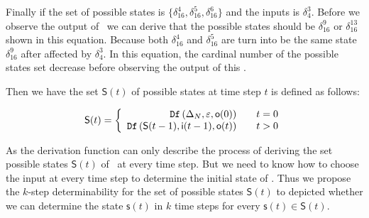 \begin{example}
 Finally if the set of possible states is $\{\delta_{16}^4,\delta_{16}^5,\delta_{16}^6\}$ and the inputs is $\delta_4^3$. Before we observe the output of \BCN\ we can derive that the possible states should be $\delta_{16}^9$ or $\delta_{16}^{13}$ shown in this equation. Because both $\delta_{16}^4$ and $\delta_{16}^5$ are turn into be the same state $\delta_{16}^9$ after affected by $\delta_4^3$.  In this equation, the cardinal number of the possible states set decrease before observing the output of this \BCN.%
 \label{exa:8}
 \end{example}   
 
 Then we have the set $\mathsf{S}(t)$ of possible states at time step $t$ is defined as follows:
 \begin{definition}[$\mathsf{S}(t)$]
	\[\mathsf{S}(t)=\left\{
\begin{array}{rcl}
{\tt Df}\left(\Delta_N,\varepsilon,\mathsf{o}(0)\right)      &      & {t=0}\\
{\tt Df}\left(\mathsf{S}(t-1),\mathsf{i}(t-1),\mathsf{o}(t)\right)       &      & {t>0}
\end{array} \right. \]
\end{definition}
 
 As the derivation function can only describe the process of deriving the set possible states $\mathsf{S}(t)$ of \BCNs\ at every time step. But we need to know how to choose the input at every time step to determine the initial state of \BCNs. Thus we propose the $k$-step determinability for the set of possible states $\mathsf{S}(t)$ to depicted whether we can determine the state $\mathsf{s}(t)$ in $k$ time steps for every $\mathsf{s}(t)\in \mathsf{S}(t)$.
